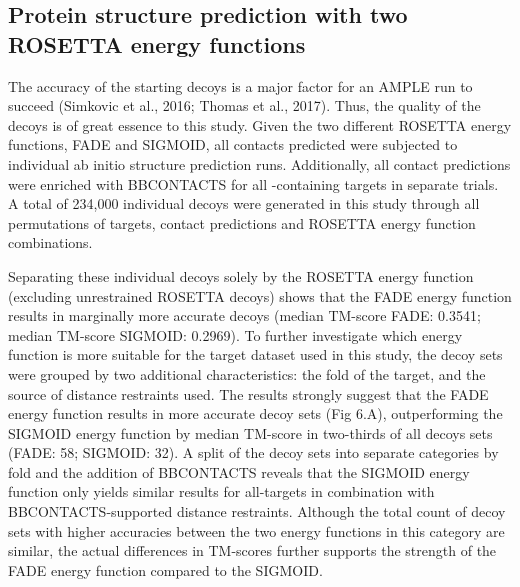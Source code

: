 \subsection{Protein structure prediction with two ROSETTA energy functions}
The accuracy of the starting decoys is a major factor for an AMPLE run to succeed (Simkovic et al., 2016; Thomas et al., 2017). Thus, the quality of the decoys is of great essence to this study. Given the two different ROSETTA energy functions, FADE and SIGMOID, all contacts predicted were subjected to individual ab initio structure prediction runs. Additionally, all contact predictions were enriched with BBCONTACTS for all \textbeta-containing targets in separate trials. A total of 234,000 individual decoys were generated in this study through all permutations of targets, contact predictions and ROSETTA energy function combinations.

Separating these individual decoys solely by the ROSETTA energy function (excluding unrestrained ROSETTA decoys) shows that the FADE energy function results in marginally more accurate decoys (median TM-score FADE: 0.3541; median TM-score SIGMOID: 0.2969). To further investigate which energy function is more suitable for the target dataset used in this study, the decoy sets were grouped by two additional characteristics: the fold of the target, and the source of distance restraints used. The results strongly suggest that the FADE energy function results in more accurate decoy sets (Fig 6.A), outperforming the SIGMOID energy function by median TM-score in two-thirds of all decoys sets (FADE: 58; SIGMOID: 32). A split of the decoy sets into separate categories by fold and the addition of BBCONTACTS reveals that the SIGMOID energy function only yields similar results for all-\textbeta targets in combination with BBCONTACTS-supported distance restraints. Although the total count of decoy sets with higher accuracies between the two energy functions in this category are similar, the actual differences in TM-scores further supports the strength of the FADE energy function compared to the SIGMOID.

